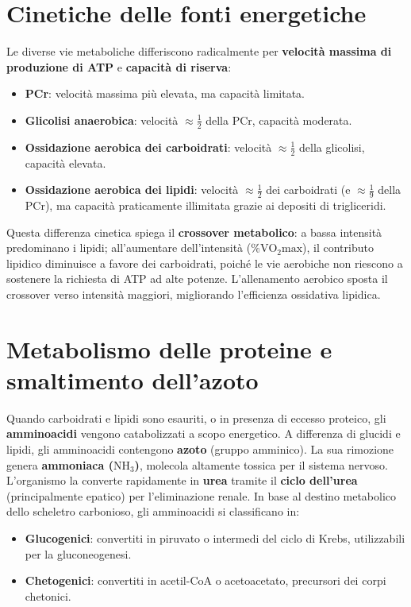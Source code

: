 \documentclass[12pt,a4paper]{report}
\begin{document}
\section{Cinetiche delle fonti energetiche}
Le diverse vie metaboliche differiscono radicalmente per \textbf{velocità massima di produzione di ATP} e \textbf{capacità di riserva}:
\begin{itemize}
\item \textbf{PCr}: velocità massima più elevata, ma capacità limitata.
\item \textbf{Glicolisi anaerobica}: velocità \(\approx \frac{1}{2}\) della PCr, capacità moderata.
\item \textbf{Ossidazione aerobica dei carboidrati}: velocità \(\approx \frac{1}{2}\) della glicolisi, capacità elevata.
\item \textbf{Ossidazione aerobica dei lipidi}: velocità \(\approx \frac{1}{2}\) dei carboidrati (e \(\approx \frac{1}{9}\) della PCr), ma capacità praticamente illimitata grazie ai depositi di trigliceridi.
\end{itemize}
Questa differenza cinetica spiega il \textbf{crossover metabolico}: a bassa intensità predominano i lipidi; all'aumentare dell'intensità (\(\% \mathrm{VO_2max}\)), il contributo lipidico diminuisce a favore dei carboidrati, poiché le vie aerobiche non riescono a sostenere la richiesta di ATP ad alte potenze. L'allenamento aerobico sposta il crossover verso intensità maggiori, migliorando l'efficienza ossidativa lipidica.

\section{Metabolismo delle proteine e smaltimento dell'azoto}
Quando carboidrati e lipidi sono esauriti, o in presenza di eccesso proteico, gli \textbf{amminoacidi} vengono catabolizzati a scopo energetico. A differenza di glucidi e lipidi, gli amminoacidi contengono \textbf{azoto} (gruppo amminico). La sua rimozione genera \textbf{ammoniaca (\(\mathrm{NH_3}\))}, molecola altamente tossica per il sistema nervoso. L'organismo la converte rapidamente in \textbf{urea} tramite il \textbf{ciclo dell'urea} (principalmente epatico) per l'eliminazione renale.
In base al destino metabolico dello scheletro carbonioso, gli amminoacidi si classificano in:
\begin{itemize}
\item \textbf{Glucogenici}: convertiti in piruvato o intermedi del ciclo di Krebs, utilizzabili per la gluconeogenesi.
\item \textbf{Chetogenici}: convertiti in acetil-CoA o acetoacetato, precursori dei corpi chetonici.
\end{itemize}
\end{document}
